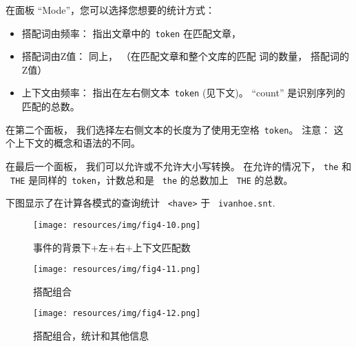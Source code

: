 \bigskip
\noindent 在面板 ``Mode''，您可以选择您想要的统计方式： 
\begin{itemize}
  \item 搭配词由频率： 指出文章中的\ \verb+token+ 在匹配文章，
  \item 搭配词由Z值： 同上，  （在匹配文章和整个文库的匹配
  词的数量， 搭配词的Z值）
  \item 上下文由频率： 指出在左右侧文本\ \verb+token+  (见下文)。 ``count'' 是识别序列的匹配的总数。
\end{itemize}

\bigskip
\noindent 在第二个面板， 我们选择左右侧文本的长度为了使用无空格\ \verb+token+。
注意： 这个上下文的概念和语法的不同。


\bigskip
\noindent 在最后一个面板， 我们可以允许或不允许大小写转换。
在允许的情况下， \verb$the$ 和  \ \verb$THE$ 是同样的\ \verb+token+，计数总和是  \ \verb$the$ 的总数加上 \ \verb$THE$ 的总数。

\bigskip
\noindent 下图显示了在计算各模式的查询统计
 \ \verb$<have>$ 于  \ \verb$ivanhoe.snt$.


\bigskip
\begin{figure}[!h]
\begin{center}
\texttt{[image: resources/img/fig4-10.png]}
\caption{事件的背景下+左+右+上下文匹配数\label{fig-statistics-mode0}}
\end{center}
\end{figure}

\begin{figure}[!h]
\begin{center}
\texttt{[image: resources/img/fig4-11.png]}
\caption{搭配组合\label{fig-statistics-mode1}}
\end{center}
\end{figure}

\begin{figure}[!h]
\begin{center}
\texttt{[image: resources/img/fig4-12.png]}
\caption{搭配组合，统计和其他信息 \label{fig-statistics-mode2}}
\end{center}
\end{figure}

